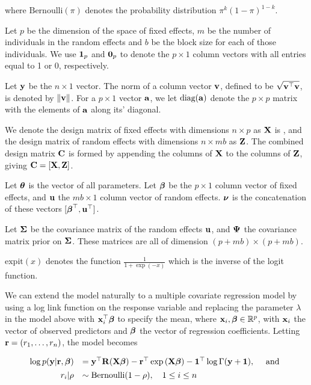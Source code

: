 where $\text{Bernoulli}(\pi)$ denotes the probability distribution $\pi^k (1 - \pi)^{1-k}$.

Let $p$ be the dimension of the space of fixed effects, $m$ be the number of individuals in the random effects
and $b$ be the block size for each of those individuals. We use ${\bf 1}_p$ and ${\bf 0}_p$ to denote the $p
\times 1$ column vectors with all entries equal to 1 or 0, respectively.

Let ${\bf y}$ be the $n \times 1$ vector. The norm of a column vector ${\bf v}$, defined to be $\sqrt{{\bf v}^\top {\bf v}}$,
is  denoted by $\|{\bf v}\|$. For a $p \times 1$ vector ${\bf a}$, we let $\text{diag}{({\bf a})}$ denote the $p \times p$
matrix with the elements of ${\bf a}$ along its' diagonal.

We denote the design matrix of fixed effects with dimensions $n \times p$ as ${\bf X}$ is , and the design matrix
of random  effects with dimensions $n \times m b$ as ${\bf Z}$. The combined design matrix ${\bf C}$ is formed by
appending the columns of ${\bf X}$ to the columns of ${\bf Z}$, giving ${\bf C} = [ {\bf X}, {\bf Z} ]$.

Let ${\boldsymbol \theta}$ is the vector of all parameters.
Let ${\boldsymbol \beta}$ be the $p \times 1$ column vector of fixed
effects, and ${\bf u}$ the $m b \times 1$ column vector of random effects. ${\boldsymbol \nu}$ is the
concatenation of these vectors $[{\boldsymbol \beta}^\top, {\bf u}^\top]$.

Let ${\boldsymbol \Sigma}$ be the covariance matrix of the random effects ${\bf u}$,
and 
${\boldsymbol \Psi}$ the covariance matrix prior on ${\boldsymbol \Sigma}$.
These matrices are all of dimension $(p + m b) \times (p + m b)$.

$\text{expit}(x)$ denotes the function $\tfrac{1}{1 + \exp(-x)}$ which is the inverse of the logit
function.

We can extend the model naturally to a multiple covariate regression model by using a log link function on the
response variable and replacing the parameter $\lambda$ in the model above with ${\bf x}_i^\top {\boldsymbol\beta}$ to specify
the mean, where ${\bf x}_i,{\boldsymbol \beta} \in {\mathbb{R}}^p$, with ${\bf x}_i$ the vector of observed predictors and ${\boldsymbol \beta}$ the
vector of regression coefficients. Letting ${\bf r} = (r_1,\ldots,r_n)$, the model becomes

\begin{equation}%
	\begin{array}{rl}
		\log p(\vy|\vr, \vbeta) 
		    & = \vy^\top \mR (\mX\vbeta)                           
		- \vr^\top \exp{(\mX\vbeta)} 
		- \vone^\top \log{\Gamma{(\vy + \vone)}}, \quad \mbox{ and }\\ [1ex]
		r_i | \rho & \sim \text{Bernoulli}(1-\rho), \quad 1 \leq i \leq n \\
	\end{array}
\end{equation}

